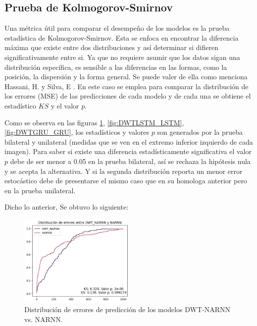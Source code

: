 
\subsection{Prueba de Kolmogorov-Smirnov}

Una métrica útil para comparar el desempeño de los modelos es la prueba estadística de Kolmogorov-Smirnov. Esta se enfoca en encontrar la diferencia máxima que existe entre dos distribuciones y así determinar si difieren significativamente entre si. Ya que no requiere asumir que los datos sigan una distribución específica, es sensible a las diferencias en las formas, como la posición, la dispersión y la forma general. Se puede valer de ella como menciona Hassani, H. y Silva, E \cite{kolmogorov}. En este caso se emplea para comparar la distribución de los errores (MSE) de las predicciones de cada modelo y de cada una se obtiene el estadístico $KS$ y el valor $p$. 

Como se observa en las figuras  \ref{fig:DWTNARNN_NARNN}, \ref{fig:DWTLSTM_LSTM}, \ref{fig:DWTGRU_GRU}, los estadísticos y valores $p$ son generados por la prueba bilateral y unilateral (medidas que se ven en el extremo inferior izquierdo de cada imagen). Para saber si existe una diferencia estadísticamente significativa el valor $p$ debe de ser menor a 0.05 en la prueba bilateral, así se rechaza la hipótesis nula y se acepta la alternativa. Y si la segunda distribución reporta un menor error estocástico debe de presentarse el mismo caso que en su homologa anterior pero en la prueba unilateral. 

Dicho lo anterior, Se obtuvo lo siguiente:

\begin{figure}[H]
    \centering
    \includegraphics[width=0.5\textwidth]{Figuras/analisis/kolmogorov/DWTNARNN_NARNN.png}
    \caption{Distribución de errores de predicción de los modelos DWT-NARNN vs. NARNN.} 
    \label{fig:DWTNARNN_NARNN}
\end{figure}

